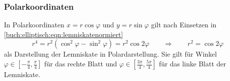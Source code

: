 \subsubsection{Polarkoordinaten}
In Polarkoordinaten $x=r\cos\varphi$ und $y=r\sin\varphi$
gilt nach Einsetzen in \eqref{buch:elliptisch:eqn:lemniskatenormiert}
\begin{equation}
r^4
=
r^2(\cos^2\varphi-\sin^2\varphi)
=
r^2\cos2\varphi
\qquad\Rightarrow\qquad
r^2 = \cos 2\varphi
\label{buch:elliptisch:eqn:lemniskatepolar}
\end{equation}
als Darstellung der Lemniskate in Polardarstellung.
Sie gilt für Winkel $\varphi\in[-\frac{\pi}4,\frac{\pi}4]$ für das
rechte Blatt und $\varphi\in[\frac{3\pi}4,\frac{5\pi}4]$ für das linke
Blatt der Lemniskate.

%
%
